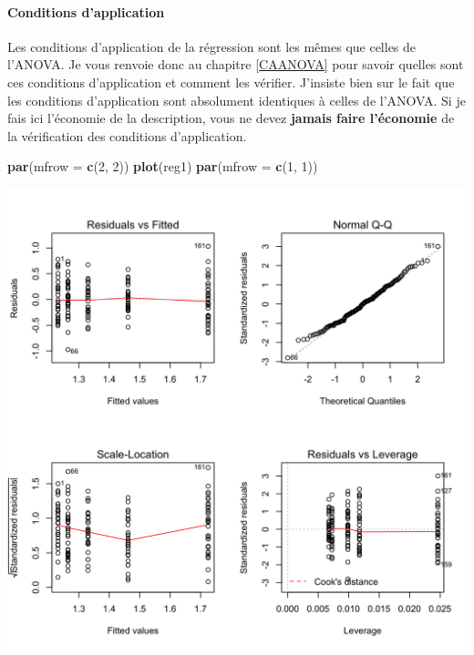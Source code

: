 \documentclass[a4paperpaper,]{article}
\newenvironment{Shaded}{\begin{snugshade}}{\end{snugshade}}
\newcommand{\DataTypeTok}[1]{\textcolor[rgb]{0.00,0.34,0.68}{#1}}
\newcommand{\DecValTok}[1]{\textcolor[rgb]{0.69,0.50,0.00}{#1}}
\newcommand{\KeywordTok}[1]{\textcolor[rgb]{0.12,0.11,0.11}{\textbf{#1}}}
\newcommand{\NormalTok}[1]{\textcolor[rgb]{0.12,0.11,0.11}{#1}}
\let\oldparagraph\paragraph
\renewcommand{\paragraph}[1]{\oldparagraph{#1}\mbox{}}
\begin{document}
\hypertarget{conditions-dapplication-4}{%
\paragraph{Conditions d'application}\label{conditions-dapplication-4}}

Les conditions d'application de la régression sont les mêmes que celles de l'ANOVA. Je vous renvoie donc au chapitre \ref{CAANOVA} pour savoir quelles sont ces conditions d'application et comment les vérifier. J'insiste bien sur le fait que les conditions d'application sont absolument identiques à celles de l'ANOVA. Si je fais ici l'économie de la description, vous ne devez \textbf{jamais faire l'économie} de la vérification des conditions d'application.

\begin{Shaded}
\begin{Highlighting}[]
\KeywordTok{par}\NormalTok{(}\DataTypeTok{mfrow =} \KeywordTok{c}\NormalTok{(}\DecValTok{2}\NormalTok{, }\DecValTok{2}\NormalTok{))}
\KeywordTok{plot}\NormalTok{(reg1)}
\KeywordTok{par}\NormalTok{(}\DataTypeTok{mfrow =} \KeywordTok{c}\NormalTok{(}\DecValTok{1}\NormalTok{, }\DecValTok{1}\NormalTok{))}
\end{Highlighting}
\end{Shaded}

\begin{center}\includegraphics[width=0.9\linewidth]{figure/unnamed-chunk-122-1} \end{center}
\end{document}
